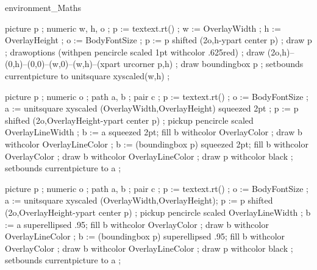 \startenvironment environment_Maths
\unprotect

%
%






\mainlanguage[fr]
\fr

\setupfloat[centeredTable][default={fixed,none}]
\setupinmargin[style=\bfxx\setupinterlinespace]
\usemodule[tikz]








picture p ; numeric w, h, o ;
p := textext.rt() ;
w := OverlayWidth ; h := OverlayHeight ; o := BodyFontSize ;
p := p shifted (2o,h-ypart center p) ; draw p ;
drawoptions (withpen pencircle scaled 1pt withcolor .625red) ;
draw (2o,h)--(0,h)--(0,0)--(w,0)--(w,h)--(xpart urcorner p,h) ;
draw boundingbox p ;
setbounds currentpicture to unitsquare xyscaled(w,h) ;
\stopuseMPgraphic



picture p ; numeric o ; path a, b ; pair c ;
p := textext.rt() ;
o := BodyFontSize ;
a := unitsquare xyscaled (OverlayWidth,OverlayHeight) squeezed 2pt ;
p := p shifted (2o,OverlayHeight-ypart center p) ;
pickup pencircle scaled OverlayLineWidth ;
b := a squeezed 2pt;
fill b withcolor OverlayColor ;
draw b withcolor OverlayLineColor ;
b := (boundingbox p) squeezed 2pt;
fill b withcolor OverlayColor ;
draw b withcolor OverlayLineColor ;
draw p withcolor black ;
setbounds currentpicture to a ;
\stopuseMPgraphic
                                                                   

picture p ; numeric o ; path a, b ; pair c ;
p := textext.rt() ;
o := BodyFontSize ;
a := unitsquare xyscaled (OverlayWidth,OverlayHeight);
p := p shifted (2o,OverlayHeight-ypart center p) ;
pickup pencircle scaled OverlayLineWidth ;
b := a superellipsed .95;
fill b withcolor OverlayColor ;
draw b withcolor OverlayLineColor ;
b := (boundingbox p) superellipsed .95;
fill b withcolor OverlayColor ;
draw b withcolor OverlayLineColor ;
draw p withcolor black ;
setbounds currentpicture to a ;
\stopuseMPgraphic
                                                                   
